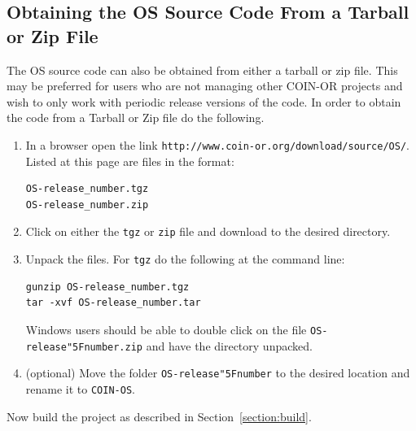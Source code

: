 \documentclass[11pt]{article}
\renewcommand{\_}{{\char"5F}}
\renewcommand{\{}{{\char"7B}}
\renewcommand{\}}{{\char"7D}}
\renewcommand{\^}{{\char"0D}}
\renewcommand{\'}{{\char"0D}}
\newcommand{\UrlOsTarball}{http://www.coin-or.org/download/source/OS/}
\begin{document}
\subsection{Obtaining the OS Source Code From a Tarball or Zip File}\label{section:getTarBalls}

The OS source code can also be obtained from either a  tarball or
zip file.  This may be preferred for users who are not managing other
COIN-OR projects and wish to only work with periodic release versions of the code.  In order to obtain the code
from a Tarball or Zip file do the following.

\vskip 8pt

\begin{enumerate}[{\bf Step 1:}]

\item{}
In a browser open the link {\tt\UrlOsTarball}.  Listed at this page are files in the format:

\begin{verbatim}
OS-release_number.tgz
OS-release_number.zip
\end{verbatim}

\vskip 8pt

\item{}
Click on either the {\tt tgz} or {\tt zip} file and download to the desired directory.

\vskip 8pt

\item{}
Unpack the files. For {\tt tgz} do the following at the command line:
\begin{verbatim}
gunzip OS-release_number.tgz
tar -xvf OS-release_number.tar
\end{verbatim}

Windows users should be  able to double click on the file {\tt OS-release\_number.zip} and have the directory unpacked.

\vskip 8pt

\item{}
(optional) Move the folder {\tt OS-release\_number} to the desired location and rename it to {\tt COIN-OS}.
\end{enumerate}


Now build the project as described in  Section~\ref{section:build}.
\end{document}

